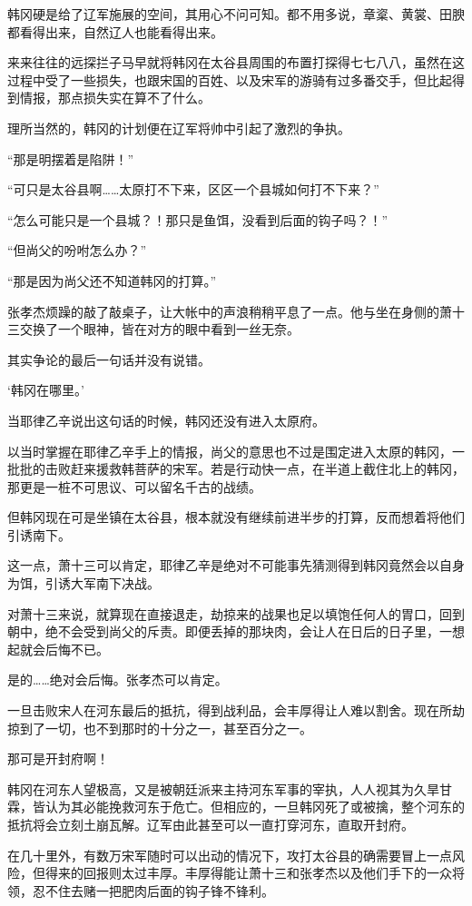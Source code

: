 韩冈硬是给了辽军施展的空间，其用心不问可知。都不用多说，章楶、黄裳、田腴都看得出来，自然辽人也能看得出来。

来来往往的远探拦子马早就将韩冈在太谷县周围的布置打探得七七八八，虽然在这过程中受了一些损失，也跟宋国的百姓、以及宋军的游骑有过多番交手，但比起得到情报，那点损失实在算不了什么。

理所当然的，韩冈的计划便在辽军将帅中引起了激烈的争执。

“那是明摆着是陷阱！”

“可只是太谷县啊……太原打不下来，区区一个县城如何打不下来？”

“怎么可能只是一个县城？！那只是鱼饵，没看到后面的钩子吗？！”

“但尚父的吩咐怎么办？”

“那是因为尚父还不知道韩冈的打算。”

张孝杰烦躁的敲了敲桌子，让大帐中的声浪稍稍平息了一点。他与坐在身侧的萧十三交换了一个眼神，皆在对方的眼中看到一丝无奈。

其实争论的最后一句话并没有说错。

‘韩冈在哪里。’

当耶律乙辛说出这句话的时候，韩冈还没有进入太原府。

以当时掌握在耶律乙辛手上的情报，尚父的意思也不过是围定进入太原的韩冈，一批批的击败赶来援救韩菩萨的宋军。若是行动快一点，在半道上截住北上的韩冈，那更是一桩不可思议、可以留名千古的战绩。

但韩冈现在可是坐镇在太谷县，根本就没有继续前进半步的打算，反而想着将他们引诱南下。

这一点，萧十三可以肯定，耶律乙辛是绝对不可能事先猜测得到韩冈竟然会以自身为饵，引诱大军南下决战。

对萧十三来说，就算现在直接退走，劫掠来的战果也足以填饱任何人的胃口，回到朝中，绝不会受到尚父的斥责。即便丢掉的那块肉，会让人在日后的日子里，一想起就会后悔不已。

是的……绝对会后悔。张孝杰可以肯定。

一旦击败宋人在河东最后的抵抗，得到战利品，会丰厚得让人难以割舍。现在所劫掠到了一切，也不到那时的十分之一，甚至百分之一。

那可是开封府啊！

韩冈在河东人望极高，又是被朝廷派来主持河东军事的宰执，人人视其为久旱甘霖，皆认为其必能挽救河东于危亡。但相应的，一旦韩冈死了或被擒，整个河东的抵抗将会立刻土崩瓦解。辽军由此甚至可以一直打穿河东，直取开封府。

在几十里外，有数万宋军随时可以出动的情况下，攻打太谷县的确需要冒上一点风险，但得来的回报则太过丰厚。丰厚得能让萧十三和张孝杰以及他们手下的一众将领，忍不住去赌一把肥肉后面的钩子锋不锋利。


